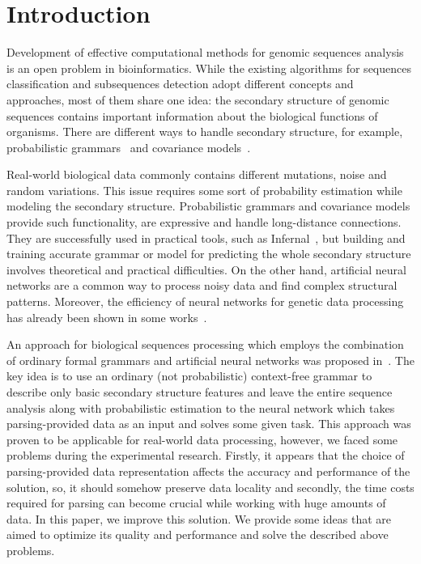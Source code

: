 \section{Introduction}
Development of effective computational methods for genomic sequences analysis is an open problem in bioinformatics.
While the existing algorithms for sequences classification and subsequences detection adopt different concepts and approaches, most of them share one idea: the secondary structure of genomic sequences contains important information about the biological functions of organisms.
There are different ways to handle secondary structure, for example, probabilistic grammars~\cite{dowell2004evaluation,knudsen1999rna} and covariance models~\cite{EddyDurbin,10.1093/nar/22.11.2079}.

Real-world biological data commonly contains different mutations, noise and random variations.
This issue requires some sort of probability estimation while modeling the secondary structure.
Probabilistic grammars and covariance models provide such functionality, are expressive and handle long-distance connections.
They are successfully used in practical tools, such as Infernal~\cite{Infernal}, but building and training accurate grammar or model for predicting the whole secondary structure involves theoretical and practical difficulties.
On the other hand, artificial neural networks are a common way to process noisy data and find complex structural patterns.
Moreover, the efficiency of neural networks for genetic data processing has already been shown in some works~\cite{ANN,Lu2019,Humidor,Singh2019,10.5555/166459.166465}.

An approach for biological sequences processing which employs the combination of ordinary formal grammars and artificial neural networks was proposed in~\cite{grigorevcomposition}.  
The key idea is to use an ordinary (not probabilistic)  context-free grammar to describe only basic secondary structure features and leave the entire sequence analysis along with probabilistic estimation to the neural network which takes parsing-provided data as an input and solves some given task. This approach was proven to be applicable for real-world data processing, however, we faced some problems during the experimental research. Firstly, it appears that the choice of parsing-provided data representation affects the accuracy and performance of the solution, so, it should somehow preserve data locality and secondly, the time costs required for parsing can become crucial while working with huge amounts of data.
In this paper, we improve this solution. 
We provide some ideas that are aimed to optimize its quality and performance and solve the described above problems.


